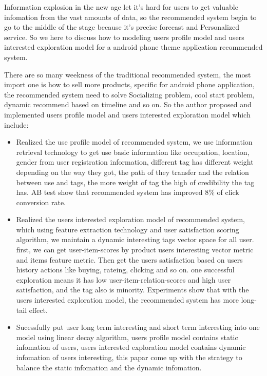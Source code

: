 \begin{enabstract}
Information explosion in the new age let it's hard for users to get valuable infomation from the vast amounts of data, so the recommended system begin to go to the middle of the stage because it's precise forecast and Personalized service. So we here to discuss how to modeling users profile model and users interested exploration model for a android phone theme application recommended system.

There are so many weekness of the traditional recommended system, the most import one is how to sell more products, specific for android phone application, the recommended system need to solve Socializing problem, cool start problem, dynamic recommend based on timeline and so on. So the author proposed and implemented users profile model and users interested exploration model which include: 
\begin{itemize}
	\item Realized the use profile model of recommended system, we use information retrieval technology to get use basic information like occupation, location, gender from user registration information, different tag has different weight depending on the way they got, the path of they transfer and the relation between use and tags, the more weight of tag the high of credibility the tag has. AB test show that recommended system has improved 8\% of click conversion rate.
	\item Realized the users interested exploration model of recommended system, which using feature extraction technology and user satisfaction scoring algorithm, we maintain a dynamic interesting tags vector space for all user. first, we can get user-item-scores by product users interesting vector metric and items feature metric. Then get the users satisfaction based on users history actions like buying, rateing, clicking and so on. one successful exploration means it has low user-item-relation-scores and high user satisfaction, and the tag also is minority. Experiments show that with the users interested exploration model, the recommended system has more long-tail effect.
	\item Sucessfully put user long term interesting and short term interesting into one model using linear decay algorithm, users profile model contains static infomation of users, users interested exploration model contains dynamic infomation of users interesting, this papar come up with the strategy to balance the static infomation and the dynamic infomation.
\end{itemize}
\end{enabstract}
